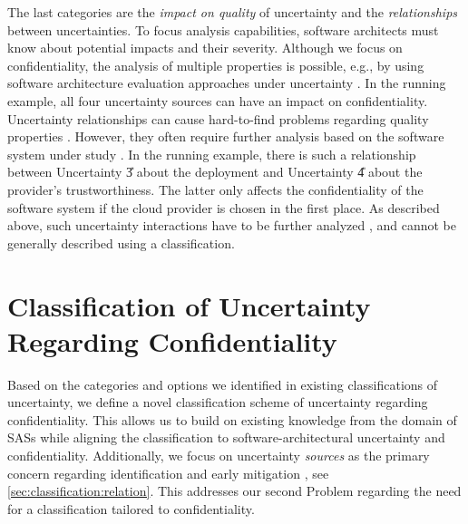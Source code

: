 The last categories are the \emph{impact on quality} of uncertainty and the \emph{relationships} between uncertainties.
To focus analysis capabilities, software architects must know about potential impacts and their severity.
Although we focus on confidentiality, the analysis of multiple properties is possible, e.g., by using software architecture evaluation approaches under uncertainty \cite{sobhy_evaluation_2021}.
In the running example, all four uncertainty sources can have an impact on confidentiality.
Uncertainty relationships can cause hard-to-find problems regarding quality properties \cite{camara_addressing_2022}.
However, they often require further analysis based on the software system under study \cite{camara_uncertainty_2024}.
In the running example, there is such a relationship between Uncertainty \U{3} about the deployment and Uncertainty \U{4} about the provider's trustworthiness.
The latter only affects the confidentiality of the software system if the cloud provider is chosen in the first place.
As described above, such uncertainty interactions have to be further analyzed \cite{camara_uncertainty_2024}, and cannot be generally described using a classification.






\section{Classification of Uncertainty Regarding Confidentiality}%
\label{sec:classification:classification}

Based on the categories and options we identified in existing classifications of uncertainty, we define a novel classification scheme of uncertainty regarding confidentiality.
This allows us to build on existing knowledge from the domain of \acp{SAS} while aligning the classification to software-architectural uncertainty and confidentiality.
Additionally, we focus on uncertainty \emph{sources} as the primary concern regarding identification and early mitigation \cite{ramirez_taxonomy_2012,perez-palacin_uncertainties_2014}, see \autoref{sec:classification:relation}.
This addresses our second Problem  regarding the need for a classification tailored to confidentiality.

